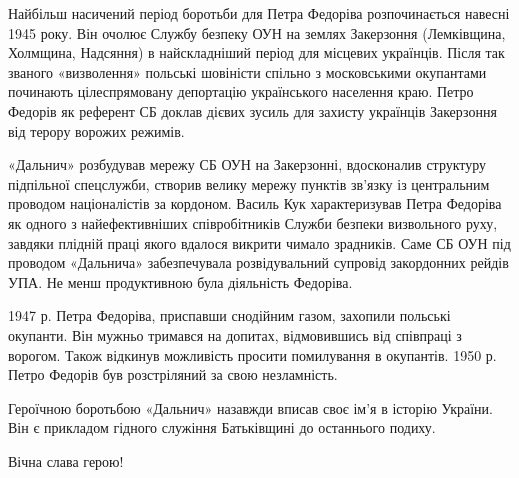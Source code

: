 Найбільш насичений період боротьби для Петра Федоріва розпочинається навесні
1945 року. Він очолює Службу безпеку ОУН на землях Закерзоння (Лемківщина,
Холмщина, Надсяння) в найскладніший період для місцевих українців. Після так
званого «визволення» польські шовіністи спільно з московськими окупантами
починають цілеспрямовану депортацію українського населення краю. Петро Федорів
як референт СБ доклав дієвих зусиль для захисту українців Закерзоння від терору
ворожих режимів.

«Дальнич» розбудував мережу СБ ОУН на Закерзонні, вдосконалив структуру
підпільної спецслужби, створив велику мережу пунктів зв’язку із центральним
проводом націоналістів за кордоном. Василь Кук характеризував Петра Федоріва як
одного з найефективніших співробітників Служби безпеки визвольного руху,
завдяки плідній праці якого вдалося викрити чимало зрадників. Саме СБ ОУН під
проводом «Дальнича» забезпечувала розвідувальний супровід закордонних рейдів
УПА. Не менш продуктивною була діяльність Федоріва.

1947 р. Петра Федоріва, приспавши снодійним газом, захопили польські окупанти.
Він мужньо тримався на допитах, відмовившись від співпраці з ворогом. Також
відкинув можливість просити помилування в окупантів. 1950 р. Петро Федорів був
розстріляний за свою незламність.

Героїчною боротьбою «Дальнич» назавжди вписав своє ім’я в історію України. Він
є прикладом гідного служіння Батьківщині до останнього подиху.

Вічна слава герою!
